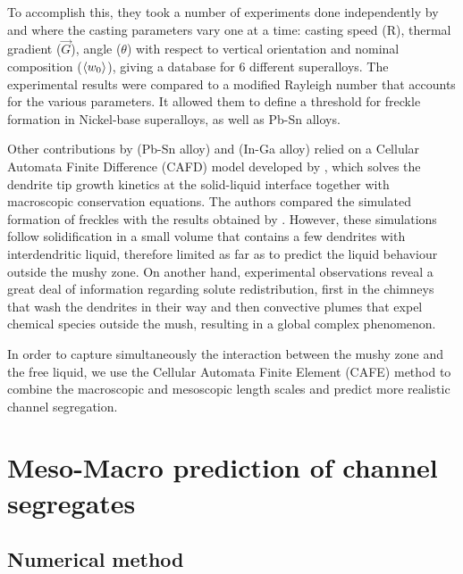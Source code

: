 To accomplish this, they took a number of experiments done independently by \citet{pollock_breakdown_1996} and \citet{auburtin_freckle_2000} 
where the casting parameters vary one at a time: casting speed (R), thermal gradient ($\vec{G}$), angle ($\theta$) with respect to vertical 
orientation and nominal composition ($\left \langle w_0 \right \rangle$), giving a database for 6 different superalloys. The experimental results were 
compared to a modified Rayleigh number that accounts for the various parameters. It allowed them to define a threshold for freckle 
formation in Nickel-base superalloys, as well as Pb-Sn alloys.

Other contributions by \citet{yuan_new_2012} (Pb-Sn alloy) and  \citet{karagadde_3-d_2014} (In-Ga alloy) relied on a Cellular Automata Finite Difference
(CAFD) model developed by \citet{lee_modeling_2002}, which  solves the dendrite tip growth kinetics at 
the solid-liquid interface together with macroscopic conservation equations. 
The authors compared the simulated formation of freckles with the results obtained by \citet{shevchenko_chimney_2013}.
However, these simulations follow solidification in a small volume that contains a few dendrites with interdendritic liquid, 
therefore limited as far as to predict the liquid behaviour outside the mushy zone.
On another hand, experimental observations reveal a great deal of information 
regarding solute redistribution, first in the chimneys that wash the dendrites in their 
way and then convective plumes that expel chemical species outside the mush, resulting in a global complex phenomenon.

In order to capture simultaneously the interaction between the mushy zone and the free liquid, we use 
the Cellular Automata Finite Element (CAFE) method to combine the macroscopic and mesoscopic length scales
and predict more realistic channel segregation.

\section{Meso-Macro prediction of channel segregates}

\subsection{Numerical method}

